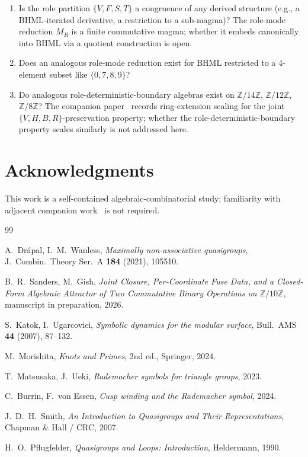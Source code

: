 \documentclass[11pt,reqno]{amsart}
\theoremstyle{plain}
\theoremstyle{definition}
\theoremstyle{remark}
\newcommand{\Z}{\mathbb{Z}}
\newcommand{\BH}{\mathrm{BHML}}
\begin{document}
\begin{enumerate}\setlength\itemsep{2pt}
\item Is the role partition $\{V, F, S, T\}$ a congruence of any
derived structure (e.g., a $\BH$-iterated derivative, a
restriction to a sub-magma)? The role-mode reduction $M_R$ is a
finite commutative magma; whether it embeds canonically into
$\BH$ via a quotient construction is open.
\item Does an analogous role-mode reduction exist for $\BH$
restricted to a 4-element subset like $\{0, 7, 8, 9\}$?
\item Do analogous role-deterministic-boundary algebras exist on
$\Z/14\Z$, $\Z/12\Z$, $\Z/8\Z$? The companion paper~\cite{FourCore}
records ring-extension scaling for the joint
$\{V, H, B, R\}$-preservation property; whether the
role-deterministic-boundary property scales similarly is not
addressed here.
\end{enumerate}

\section*{Acknowledgments}

This work is a self-contained algebraic-combinatorial study;
familiarity with adjacent companion work~\cite{FourCore} is not
required.

\begin{thebibliography}{99}

A.~Dr\'apal, I.~M.~Wanless, \emph{Maximally non-associative
quasigroups}, J.\ Combin.\ Theory Ser.\ A \textbf{184} (2021),
105510.

 B.~R.~Sanders, M.~Gish,
\emph{Joint Closure, Per-Coordinate Fuse Data, and a Closed-Form
Algebraic Attractor of Two Commutative Binary Operations on
$\Z/10\Z$}, manuscript in preparation, 2026.

 S.~Katok, I.~Ugarcovici,
\emph{Symbolic dynamics for the modular surface},
Bull.\ AMS \textbf{44} (2007), 87--132.

 M.~Morishita,
\emph{Knots and Primes}, 2nd ed., Springer, 2024.

 T.~Matsusaka, J.~Ueki,
\emph{Rademacher symbols for triangle groups}, 2023.

 C.~Burrin, F.~von Essen,
\emph{Cusp winding and the Rademacher symbol}, 2024.

 J.~D.~H.~Smith,
\emph{An Introduction to Quasigroups and Their Representations},
Chapman \& Hall / CRC, 2007.

 H.~O.~Pflugfelder,
\emph{Quasigroups and Loops: Introduction}, Heldermann, 1990.

\end{thebibliography}
\end{document}
